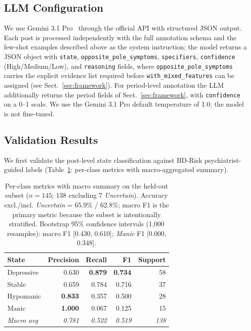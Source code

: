 \documentclass[runningheads]{llncs}
\begin{document}
\subsection{LLM Configuration}

We use Gemini 3.1 Pro~\cite{google2026gemini31pro} through the official API with structured JSON output. Each post is processed independently with the full annotation schema and the few-shot examples described above as the system instruction; the model returns a JSON object with \texttt{state}, \texttt{opposite\_pole\_symptoms}, \texttt{specifiers}, \texttt{confidence} (High/Medium/Low), and \texttt{reasoning} fields, where \texttt{opposite\_pole\_symptoms} carries the explicit evidence list required before \texttt{with\_mixed\_features} can be assigned (see Sect.~\ref{sec:framework}). For period-level annotation the LLM additionally returns the period fields of Sect.~\ref{sec:framework}, with \texttt{confidence} on a 0--1 scale. We use the Gemini 3.1 Pro default temperature of 1.0; the model is not fine-tuned.

\subsection{Validation Results}
\label{sec:bdresult}

We first validate the post-level state classification against BD-Risk psychiatrist-guided labels (Table~\ref{tab:state-metrics}: per-class metrics with macro-aggregated summary).

\begin{table}[t]
\caption{Per-class metrics with macro summary on the held-out subset ($n=145$; 138 excluding 7 \emph{Uncertain}). Accuracy excl./incl. \emph{Uncertain} = 65.9\% / 62.8\%; macro F1 is the primary metric because the subset is intentionally stratified. Bootstrap 95\% confidence intervals (1{,}000 resamples): macro F1 [0.430, 0.610]; \emph{Manic} F1 [0.000, 0.348].}
\label{tab:state-metrics}
\centering
\setlength{\tabcolsep}{9pt}
\begin{tabular}{lrrrr}
\toprule
\textbf{State} & \textbf{Precision} & \textbf{Recall} & \textbf{F1} & \textbf{Support} \\
\midrule
Depressive & 0.630 & \textbf{0.879} & \textbf{0.734} & 58 \\
Stable & 0.659 & 0.784 & 0.716 & 37 \\
Hypomanic & \textbf{0.833} & 0.357 & 0.500 & 28 \\
Manic & \textbf{1.000} & 0.067 & 0.125 & 15 \\
\midrule
\emph{Macro avg} & \emph{0.781} & \emph{0.522} & \emph{0.519} & \emph{138} \\
\bottomrule
\end{tabular}
\end{table}
\end{document}

